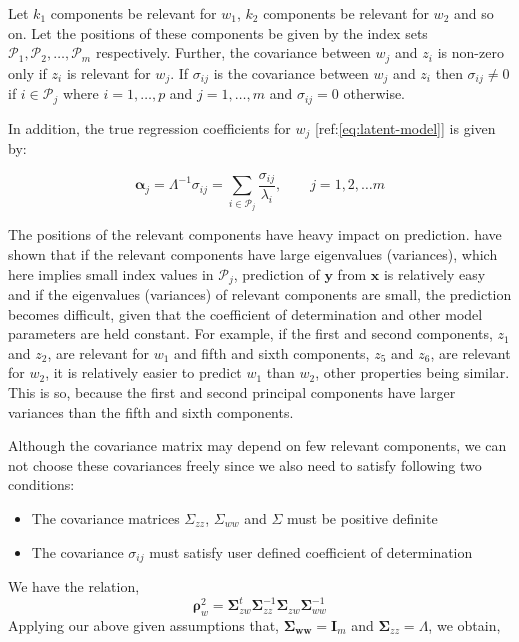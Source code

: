 \documentclass[3p,times,12pt,authoryear]{elsarticle}
\providecommand{\tightlist}{%
  \setlength{\itemsep}{0pt}\setlength{\parskip}{0pt}}
\theoremstyle{definition}
\theoremstyle{definition}
\theoremstyle{remark}
\begin{document}
Let \(k_1\) components be relevant for \(w_1\), \(k_2\) components be
relevant for \(w_2\) and so on. Let the positions of these components be
given by the index sets
\(\mathcal{P}_1, \mathcal{P}_2, \ldots, \mathcal{P}_m\) respectively.
Further, the covariance between \(w_j\) and \(z_i\) is non-zero only if
\(z_i\) is relevant for \(w_j\). If \(\sigma_{ij}\) is the covariance
between \(w_j\) and \(z_i\) then \(\sigma_{ij} \ne 0\) if
\(i \in \mathcal{P}_j\) where \(i = 1, \ldots, p\) and
\(j = 1, \ldots, m\) and \(\sigma_{ij} = 0\) otherwise.

In addition, the true regression coefficients for \(w_j\)
{[}ref:\eqref{eq:latent-model}{]} is given by:

\[
\boldsymbol{\alpha}_j = \Lambda^{-1} \sigma_{ij} = \sum_{i \in \mathcal{P}_j}\frac{\sigma_{ij}}{\lambda_i},\qquad j = 1, 2, \ldots m
\]

The positions of the relevant components have heavy impact on
prediction. \citet{helland1994comparison} have shown that if the
relevant components have large eigenvalues (variances), which here
implies small index values in \(\mathcal{P}_j\), prediction of
\(\mathbf{y}\) from \(\mathbf{x}\) is relatively easy and if the
eigenvalues (variances) of relevant components are small, the prediction
becomes difficult, given that the coefficient of determination and other
model parameters are held constant. For example, if the first and second
components, \(z_1\) and \(z_2\), are relevant for \(w_1\) and fifth and
sixth components, \(z_5\) and \(z_6\), are relevant for \(w_2\), it is
relatively easier to predict \(w_1\) than \(w_2\), other properties
being similar. This is so, because the first and second principal
components have larger variances than the fifth and sixth components.

Although the covariance matrix may depend on few relevant components, we
can not choose these covariances freely since we also need to satisfy
following two conditions:

\begin{itemize}
\tightlist
\item
  The covariance matrices \(\Sigma_{zz}\), \(\Sigma_{ww}\) and
  \(\Sigma\) must be positive definite
\item
  The covariance \(\sigma_{ij}\) must satisfy user defined coefficient
  of determination
\end{itemize}

We have the relation,
\[\boldsymbol{\rho}_w^2 = \boldsymbol{\Sigma}_{zw}^t\boldsymbol{\Sigma}_{zz}^{-1}\boldsymbol{\Sigma}_{zw}\boldsymbol{\Sigma}_{ww}^{-1}\]
Applying our above given assumptions that,
\(\boldsymbol{\Sigma_{ww}} = \mathbf{I}_m\) and
\(\boldsymbol{\Sigma}_{zz} = \Lambda\), we obtain,
\end{document}
